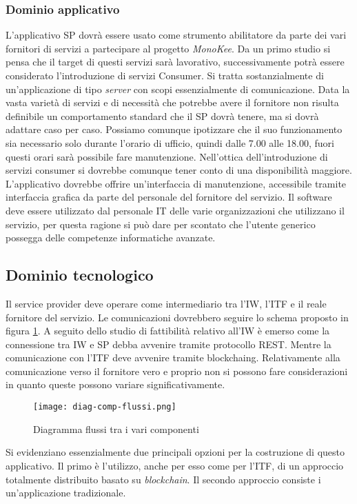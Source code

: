 \subsubsection{Dominio applicativo}
L’applicativo SP dovrà essere usato come strumento abilitatore da parte dei vari fornitori di servizi a partecipare al progetto \emph{MonoKee}. Da un primo studio si pensa che il target di questi servizi sarà lavorativo, successivamente potrà essere considerato l’introduzione di servizi Consumer. Si tratta sostanzialmente di un’applicazione di tipo \emph{server} con scopi essenzialmente di comunicazione. Data la vasta varietà di servizi e di necessità che potrebbe avere il fornitore non risulta definibile un comportamento standard che il SP dovrà tenere, ma si dovrà adattare caso per caso. Possiamo comunque ipotizzare che il suo funzionamento sia necessario solo durante l’orario di ufficio, quindi dalle 7.00 alle 18.00, fuori questi orari sarà possibile fare manutenzione. Nell’ottica dell’introduzione di servizi consumer si dovrebbe comunque tener conto di una disponibilità maggiore. L’applicativo dovrebbe offrire un’interfaccia di manutenzione, accessibile tramite interfaccia grafica da parte del personale del fornitore del servizio. Il software deve essere utilizzato dal personale IT delle varie organizzazioni che utilizzano il servizio, per questa ragione si può dare per scontato che l’utente generico possegga delle competenze informatiche avanzate. 
\subsection{Dominio tecnologico}
Il service provider deve operare come intermediario tra l’IW, l’ITF e il reale fornitore del servizio. Le comunicazioni dovrebbero seguire lo schema proposto in figura \ref{fig:diag-flussi}. 
A seguito dello studio di fattibilità relativo all’IW è emerso come la connessione tra IW e SP debba avvenire tramite protocollo REST. Mentre la comunicazione con l’ITF deve avvenire tramite \gls{blockchaing}. Relativamente alla comunicazione verso il fornitore vero e proprio non si possono fare considerazioni in quanto queste possono variare significativamente.

\begin{figure}[!h]
    \centering
    \texttt{[image: diag-comp-flussi.png]} 
    \caption{Diagramma flussi tra i vari componenti}
    \label{fig:diag-flussi} 
\end{figure}
Si evidenziano essenzialmente due principali opzioni per la costruzione di questo applicativo. Il primo è l’utilizzo, anche per esso come per l’ITF, di un approccio totalmente distribuito basato su \emph{blockchain}.  Il secondo approccio consiste i un’applicazione tradizionale.  
